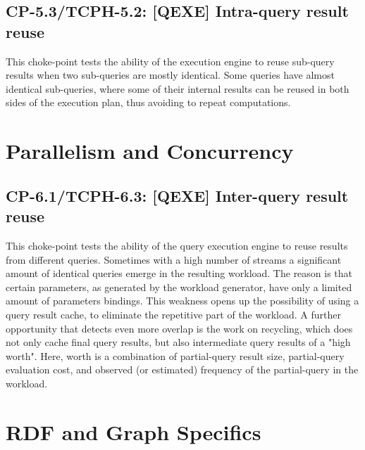 

\subsection*{CP-5.3/TCPH-5.2: [QEXE] Intra-query result reuse}
\label{choke_point_5.3}
This choke-point tests the ability of the execution engine to reuse sub-query results when two sub-queries are mostly identical.
Some queries have almost identical sub-queries, where some of their internal results can be reused in both sides of the execution plan, thus avoiding to repeat computations.




\section{Parallelism and Concurrency}

\subsection*{CP-6.1/TCPH-6.3: [QEXE] Inter-query result reuse}
\label{choke_point_6.1}
This choke-point tests the ability of the query execution engine to reuse results from different queries. Sometimes with a high number of streams a significant amount of identical queries emerge in the resulting workload.
The reason is that certain parameters, as generated by the workload generator, have only a limited amount of parameters bindings.
This weakness opens up the possibility of using a query result cache, to eliminate the repetitive part of the workload.
A further opportunity that detects even more overlap is the work on recycling, which does not only cache final query results, but also intermediate query results of a "high worth".
Here, worth is a combination of partial-query result size, partial-query evaluation cost, and observed (or estimated) frequency of the partial-query in the workload.




\section{RDF and Graph Specifics}

